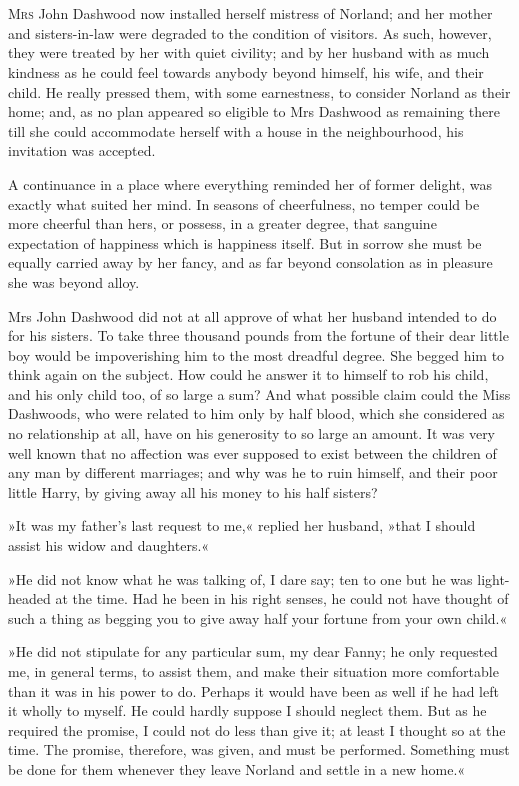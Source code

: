 \chapter[Chapter \thechapter]{}
\lettrine[lines=4,lraise=0.3]{M}{rs} John Dashwood now installed herself mistress of Norland; and her mother and sisters-in-law were degraded to the condition of visitors. As such, however, they were treated by her with quiet civility; and by her husband with as much kindness as he could feel towards anybody beyond himself, his wife, and their child. He really pressed them, with some earnestness, to consider Norland as their home; and, as no plan appeared so eligible to Mrs Dashwood as remaining there till she could accommodate herself with a house in the neighbourhood, his invitation was accepted.

A continuance in a place where everything reminded her of former delight, was exactly what suited her mind. In seasons of cheerfulness, no temper could be more cheerful than hers, or possess, in a greater degree, that sanguine expectation of happiness which is happiness itself. But in sorrow she must be equally carried away by her fancy, and as far beyond consolation as in pleasure she was beyond alloy.

Mrs John Dashwood did not at all approve of what her husband intended to do for his sisters. To take three thousand pounds from the fortune of their dear little boy would be impoverishing him to the most dreadful degree. She begged him to think again on the subject. How could he answer it to himself to rob his child, and his only child too, of so large a sum? And what possible claim could the Miss Dashwoods, who were related to him only by half blood, which she considered as no relationship at all, have on his generosity to so large an amount. It was very well known that no affection was ever supposed to exist between the children of any man by different marriages; and why was he to ruin himself, and their poor little Harry, by giving away all his money to his half sisters?

»It was my father’s last request to me,« replied her husband, »that I should assist his widow and daughters.«

»He did not know what he was talking of, I dare say; ten to one but he was light-headed at the time. Had he been in his right senses, he could not have thought of such a thing as begging you to give away half your fortune from your own child.«

»He did not stipulate for any particular sum, my dear Fanny; he only requested me, in general terms, to assist them, and make their situation more comfortable than it was in his power to do. Perhaps it would have been as well if he had left it wholly to myself. He could hardly suppose I should neglect them. But as he required the promise, I could not do less than give it; at least I thought so at the time. The promise, therefore, was given, and must be performed. Something must be done for them whenever they leave Norland and settle in a new home.«

